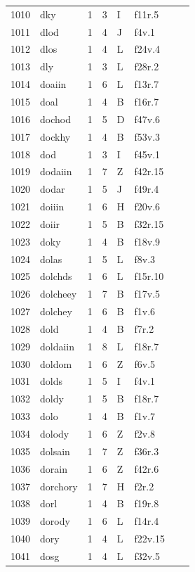 \documentclass[11pt,a4paper]{article}
\begin{document}
\begin{landscape}
\begin{longtable}{@{}r>{\ttfamily}lrrl>{\ttfamily}l>{\raggedright\arraybackslash}p{80mm}>{\raggedright\arraybackslash}p{36mm}@{}}
1010 & dky & 1 & 3 & I & f11r.5 &  & \\
1011 & dlod & 1 & 4 & J & f4v.1 &  & \\
1012 & dlos & 1 & 4 & L & f24v.4 &  & \\
1013 & dly & 1 & 3 & L & f28r.2 &  & \\
1014 & doaiin & 1 & 6 & L & f13r.7 &  & \\
1015 & doal & 1 & 4 & B & f16r.7 &  & \\
1016 & dochod & 1 & 5 & D & f47v.6 &  & \\
1017 & dockhy & 1 & 4 & B & f53v.3 &  & \\
1018 & dod & 1 & 3 & I & f45v.1 &  & \\
1019 & dodaiin & 1 & 7 & Z & f42r.15 &  & \\
1020 & dodar & 1 & 5 & J & f49r.4 &  & \\
1021 & doiiin & 1 & 6 & H & f20v.6 &  & \\
1022 & doiir & 1 & 5 & B & f32r.15 &  & \\
1023 & doky & 1 & 4 & B & f18v.9 &  & \\
1024 & dolas & 1 & 5 & L & f8v.3 &  & \\
1025 & dolchds & 1 & 6 & L & f15r.10 &  & \\
1026 & dolcheey & 1 & 7 & B & f17v.5 &  & \\
1027 & dolchey & 1 & 6 & B & f1v.6 &  & \\
1028 & dold & 1 & 4 & B & f7r.2 &  & \\
1029 & doldaiin & 1 & 8 & L & f18r.7 &  & \\
1030 & doldom & 1 & 6 & Z & f6v.5 &  & \\
1031 & dolds & 1 & 5 & I & f4v.1 &  & \\
1032 & doldy & 1 & 5 & B & f18r.7 &  & \\
1033 & dolo & 1 & 4 & B & f1v.7 &  & \\
1034 & dolody & 1 & 6 & Z & f2v.8 &  & \\
1035 & dolsain & 1 & 7 & Z & f36r.3 &  & \\
1036 & dorain & 1 & 6 & Z & f42r.6 &  & \\
1037 & dorchory & 1 & 7 & H & f2r.2 &  & \\
1038 & dorl & 1 & 4 & B & f19r.8 &  & \\
1039 & dorody & 1 & 6 & L & f14r.4 &  & \\
1040 & dory & 1 & 4 & L & f22v.15 &  & \\
1041 & dosg & 1 & 4 & L & f32v.5 &  & \\

\end{longtable}
\end{landscape}
\end{document}
